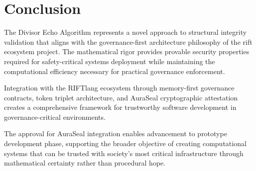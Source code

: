 \documentclass[11pt,letterpaper]{article}
\begin{document}
\section{Conclusion}

The Divisor Echo Algorithm represents a novel approach to structural integrity validation that aligns with the governance-first architecture philosophy of the rift ecosystem project. The mathematical rigor provides provable security properties required for safety-critical systems deployment while maintaining the computational efficiency necessary for practical governance enforcement.

Integration with the RIFTlang ecosystem through memory-first governance contracts, token triplet architecture, and AuraSeal cryptographic attestation creates a comprehensive framework for trustworthy software development in governance-critical environments.

The approval for AuraSeal integration enables advancement to prototype development phase, supporting the broader objective of creating computational systems that can be trusted with society's most critical infrastructure through mathematical certainty rather than procedural hope.
\end{document}
